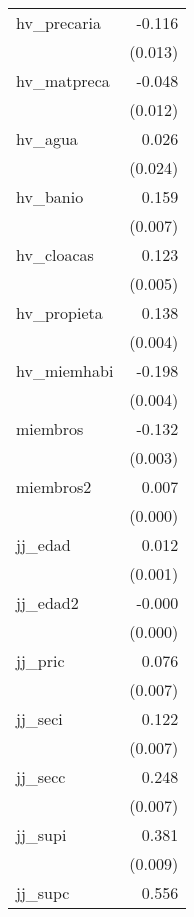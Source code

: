 {\begin{longtable}{l*{1}{D{.}{.}{-1}}}
\addlinespace
hv\_precaria &      -0.116\sym{***}\\
            &     (0.013)         \\
\addlinespace
hv\_matpreca &      -0.048\sym{***}\\
            &     (0.012)         \\
\addlinespace
hv\_agua     &       0.026         \\
            &     (0.024)         \\
\addlinespace
hv\_banio    &       0.159\sym{***}\\
            &     (0.007)         \\
\addlinespace
hv\_cloacas  &       0.123\sym{***}\\
            &     (0.005)         \\
\addlinespace
hv\_propieta &       0.138\sym{***}\\
            &     (0.004)         \\
\addlinespace
hv\_miemhabi &      -0.198\sym{***}\\
            &     (0.004)         \\
\addlinespace
miembros    &      -0.132\sym{***}\\
            &     (0.003)         \\
\addlinespace
miembros2   &       0.007\sym{***}\\
            &     (0.000)         \\
\addlinespace
jj\_edad     &       0.012\sym{***}\\
            &     (0.001)         \\
\addlinespace
jj\_edad2    &      -0.000\sym{***}\\
            &     (0.000)         \\
\addlinespace
jj\_pric     &       0.076\sym{***}\\
            &     (0.007)         \\
\addlinespace
jj\_seci     &       0.122\sym{***}\\
            &     (0.007)         \\
\addlinespace
jj\_secc     &       0.248\sym{***}\\
            &     (0.007)         \\
\addlinespace
jj\_supi     &       0.381\sym{***}\\
            &     (0.009)         \\
\addlinespace
jj\_supc     &       0.556\sym{***}\\

\end{longtable}}

